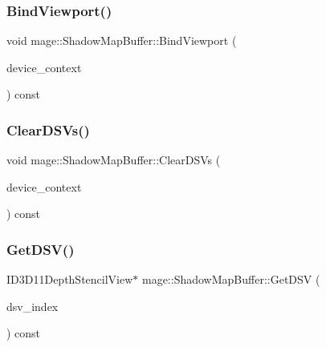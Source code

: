\hypertarget{structmage_1_1_shadow_map_buffer_ae0d097c959ff2cdb2aabdd246c654039}{}\label{structmage_1_1_shadow_map_buffer_ae0d097c959ff2cdb2aabdd246c654039} 
\subsubsection{\texorpdfstring{Bind\+Viewport()}{BindViewport()}}
{\footnotesize\ttfamily void mage\+::\+Shadow\+Map\+Buffer\+::\+Bind\+Viewport (\begin{DoxyParamCaption}\item[{I\+D3\+D11\+Device\+Context4 $\ast$}]{device\+\_\+context }\end{DoxyParamCaption}) const\hspace{0.3cm}{\ttfamily [noexcept]}}

\hypertarget{structmage_1_1_shadow_map_buffer_ac2e03bb5d33f5014d9ef66df401308d9}{}\label{structmage_1_1_shadow_map_buffer_ac2e03bb5d33f5014d9ef66df401308d9} 
\subsubsection{\texorpdfstring{Clear\+D\+S\+Vs()}{ClearDSVs()}}
{\footnotesize\ttfamily void mage\+::\+Shadow\+Map\+Buffer\+::\+Clear\+D\+S\+Vs (\begin{DoxyParamCaption}\item[{I\+D3\+D11\+Device\+Context4 $\ast$}]{device\+\_\+context }\end{DoxyParamCaption}) const\hspace{0.3cm}{\ttfamily [noexcept]}}

\hypertarget{structmage_1_1_shadow_map_buffer_a8762dcdaca36c7a206dac362d387f0f1}{}\label{structmage_1_1_shadow_map_buffer_a8762dcdaca36c7a206dac362d387f0f1} 
\subsubsection{\texorpdfstring{Get\+D\+S\+V()}{GetDSV()}}
{\footnotesize\ttfamily I\+D3\+D11\+Depth\+Stencil\+View$\ast$ mage\+::\+Shadow\+Map\+Buffer\+::\+Get\+D\+SV (\begin{DoxyParamCaption}\item[{size\+\_\+t}]{dsv\+\_\+index }\end{DoxyParamCaption}) const\hspace{0.3cm}{\ttfamily [noexcept]}}

